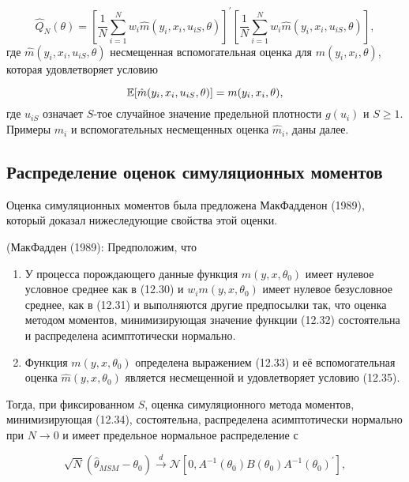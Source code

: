 \begin{equation}
\hat{Q}_{N}(\theta)=\left[\dfrac{1}{N}\sum^{N}_{i=1}w_{i}\hat{m}(y_i,x_i,u_{iS},\theta) \right]^{'}\left[\dfrac{1}{N}\sum^{N}_{i=1}w_{i}\hat{m}(y_i,x_i,u_{iS},\theta) \right],  
\end{equation}
где $\hat{m}(y_i,x_i,u_{iS},\theta)$ несмещенная вспомогательная оценка для $m(y_i,x_i,\theta)$, которая удовлетворяет условию

\begin{equation}
\mathbb{E}[\hat{m}(y_i,x_i,u_{iS},\theta)]=m(y_i,x_i,\theta),
\end{equation}
где $u_{iS}$ означает $S$-тое случайное значение предельной плотности $g(u_i)$ и $S\geq 1$. Примеры $m_i$ и вспомогательных несмещенных оценка $\hat{m}_i$,  даны далее.

\subsection{Распределение оценок симуляционных моментов}

Оценка симуляционных моментов была предложена МакФадденон (1989), который доказал нижеследующие свойства этой оценки.

\begin{proposition} (МакФадден (1989): Предположим, что 
\begin{enumerate}
\item У процесса порождающего данные функция $m(y,x,\theta_0)$ имеет нулевое условное среднее как в (12.30) и $w_{i}m(y,x,\theta_0)$ имеет нулевое безусловное среднее, как в (12.31) и выполняются другие предпосылки так, что оценка методом моментов, минимизирующая значение функции (12.32) состоятельна и распределена асимптотически нормально.
\item Функция $m(y,x,\theta_0)$ определена выражением (12.33) и её вспомогательная оценка $\hat{m}(y,x,\theta_0)$ является несмещенной и удовлетворяет условию (12.35).
\end{enumerate}
Тогда, при фиксированном $S$, оценка симуляционного метода моментов, минимизирующая (12.34), состоятельна, распределена асимптотически нормально при $N \rightarrow 0$ и имеет предельное нормальное распределение с
\end{proposition}

\begin{equation}
\sqrt{N}(\hat{\theta}_{MSM}-\theta_0) \stackrel{d}{\rightarrow} \mathcal{N}[0,A^{-1}(\theta_0)B(\theta_0)A^{-1}{(\theta_0)}^{'}],
\end{equation}

